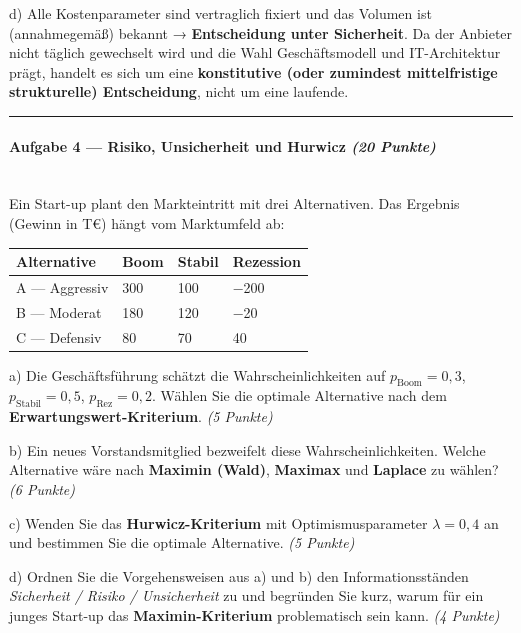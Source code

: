 \documentclass[11pt, a4paper]{article}
\begin{document}
d) Alle Kostenparameter sind vertraglich fixiert und das Volumen ist (annahmegemäß) bekannt → \textbf{Entscheidung unter Sicherheit}. Da der Anbieter nicht täglich gewechselt wird und die Wahl Geschäftsmodell und IT-Architektur prägt, handelt es sich um eine \textbf{konstitutive (oder zumindest mittelfristige strukturelle) Entscheidung}, nicht um eine laufende.



\noindent\textcolor{rulegray}{\rule{\linewidth}{0.4pt}}


\paragraph{Aufgabe 4 — Risiko, Unsicherheit und Hurwicz \textit{(20 Punkte)}}\mbox{}\\[2pt]

Ein Start-up plant den Markteintritt mit drei Alternativen. Das Ergebnis (Gewinn in T€) hängt vom Marktumfeld ab:



{\small
\begin{tabularx}{\linewidth}{XXXX}
\hline
\rowcolor{tableheadbg}
{\color{white}\textbf{Alternative}} & {\color{white}\textbf{Boom}} & {\color{white}\textbf{Stabil}} & {\color{white}\textbf{Rezession}} \\[2pt]
\hline
\endhead
\hline
\endfoot
A — Aggressiv & 300 & 100 & −200 \\
B — Moderat & 180 & 120 & −20 \\
C — Defensiv & 80 & 70 & 40 \\
\end{tabularx}
}


a) Die Geschäftsführung schätzt die Wahrscheinlichkeiten auf $p_{\text{Boom}}=0{,}3$, $p_{\text{Stabil}}=0{,}5$, $p_{\text{Rez}}=0{,}2$. Wählen Sie die optimale Alternative nach dem \textbf{Erwartungswert-Kriterium}. \textit{(5 Punkte)}


b) Ein neues Vorstandsmitglied bezweifelt diese Wahrscheinlichkeiten. Welche Alternative wäre nach \textbf{Maximin (Wald)}, \textbf{Maximax} und \textbf{Laplace} zu wählen? \textit{(6 Punkte)}


c) Wenden Sie das \textbf{Hurwicz-Kriterium} mit Optimismusparameter $\lambda = 0{,}4$ an und bestimmen Sie die optimale Alternative. \textit{(5 Punkte)}


d) Ordnen Sie die Vorgehensweisen aus a) und b) den Informationsständen \textit{Sicherheit / Risiko / Unsicherheit} zu und begründen Sie kurz, warum für ein junges Start-up das \textbf{Maximin-Kriterium} problematisch sein kann. \textit{(4 Punkte)}
\end{document}
